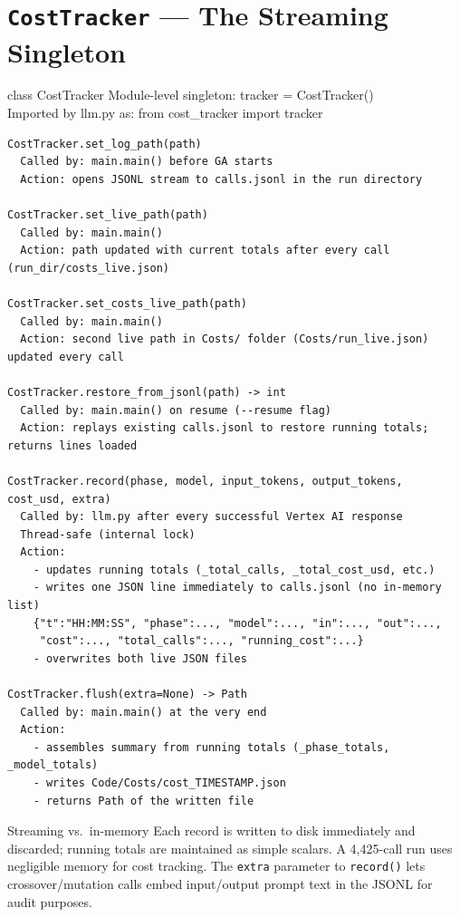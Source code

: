 \documentclass[11pt,a4paper]{report}
\newcommand{\fn}[1]{\texttt{#1}}
\begin{document}
\section{\fn{CostTracker} --- The Streaming Singleton}

\begin{spec}{class CostTracker}
Module-level singleton: tracker = CostTracker() \\
Imported by llm.py as: from cost\_tracker import tracker
\end{spec}

\begin{lstlisting}[style=chain]
CostTracker.set_log_path(path)
  Called by: main.main() before GA starts
  Action: opens JSONL stream to calls.jsonl in the run directory

CostTracker.set_live_path(path)
  Called by: main.main()
  Action: path updated with current totals after every call (run_dir/costs_live.json)

CostTracker.set_costs_live_path(path)
  Called by: main.main()
  Action: second live path in Costs/ folder (Costs/run_live.json) updated every call

CostTracker.restore_from_jsonl(path) -> int
  Called by: main.main() on resume (--resume flag)
  Action: replays existing calls.jsonl to restore running totals; returns lines loaded

CostTracker.record(phase, model, input_tokens, output_tokens, cost_usd, extra)
  Called by: llm.py after every successful Vertex AI response
  Thread-safe (internal lock)
  Action:
    - updates running totals (_total_calls, _total_cost_usd, etc.)
    - writes one JSON line immediately to calls.jsonl (no in-memory list)
    {"t":"HH:MM:SS", "phase":..., "model":..., "in":..., "out":...,
     "cost":..., "total_calls":..., "running_cost":...}
    - overwrites both live JSON files

CostTracker.flush(extra=None) -> Path
  Called by: main.main() at the very end
  Action:
    - assembles summary from running totals (_phase_totals, _model_totals)
    - writes Code/Costs/cost_TIMESTAMP.json
    - returns Path of the written file
\end{lstlisting}

\begin{concept}{Streaming vs.\ in-memory}
Each record is written to disk immediately and discarded; running totals are maintained
as simple scalars.  A 4,425-call run uses negligible memory for cost tracking.
The \fn{extra} parameter to \fn{record()} lets crossover/mutation calls embed
input/output prompt text in the JSONL for audit purposes.
\end{concept}
\end{document}
